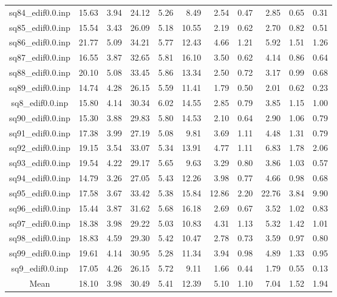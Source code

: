 {\begin{longtable}{@{}cr@{\hspace{1em}}r@{\hspace{1em}}r@{\hspace{1em}}r@{\hspace{1em}}r@{\hspace{2em}}r@{\hspace{1em}}r@{\hspace{1em}}r@{\hspace{1em}}r@{\hspace{1em}}r@{}}
sq84\_edif0.0.inp&15.63&3.94&24.12&5.26&8.49&2.54&0.47&2.85&0.65&0.31\\
sq85\_edif0.0.inp&15.54&3.43&26.09&5.18&10.55&2.19&0.62&2.70&0.82&0.51\\
sq86\_edif0.0.inp&21.77&5.09&34.21&5.77&12.43&4.66&1.21&5.92&1.51&1.26\\
sq87\_edif0.0.inp&16.55&3.87&32.65&5.81&16.10&3.50&0.62&4.14&0.86&0.64\\
sq88\_edif0.0.inp&20.10&5.08&33.45&5.86&13.34&2.50&0.72&3.17&0.99&0.68\\
sq89\_edif0.0.inp&14.74&4.28&26.15&5.59&11.41&1.79&0.50&2.01&0.62&0.23\\
sq8\_edif0.0.inp&15.80&4.14&30.34&6.02&14.55&2.85&0.79&3.85&1.15&1.00\\
sq90\_edif0.0.inp&15.30&3.88&29.83&5.80&14.53&2.10&0.64&2.90&1.06&0.79\\
sq91\_edif0.0.inp&17.38&3.99&27.19&5.08&9.81&3.69&1.11&4.48&1.31&0.79\\
sq92\_edif0.0.inp&19.15&3.54&33.07&5.34&13.91&4.77&1.11&6.83&1.78&2.06\\
sq93\_edif0.0.inp&19.54&4.22&29.17&5.65&9.63&3.29&0.80&3.86&1.03&0.57\\
sq94\_edif0.0.inp&14.79&3.26&27.05&5.43&12.26&3.98&0.77&4.66&0.98&0.68\\
sq95\_edif0.0.inp&17.58&3.67&33.42&5.38&15.84&12.86&2.20&22.76&3.84&9.90\\
sq96\_edif0.0.inp&15.44&3.87&31.62&5.68&16.18&2.69&0.67&3.52&1.02&0.83\\
sq97\_edif0.0.inp&18.38&3.98&29.22&5.03&10.83&4.31&1.13&5.32&1.42&1.01\\
sq98\_edif0.0.inp&18.83&4.59&29.30&5.42&10.47&2.78&0.73&3.59&0.97&0.80\\
sq99\_edif0.0.inp&19.61&4.14&30.95&5.28&11.34&3.94&0.98&4.89&1.33&0.95\\
sq9\_edif0.0.inp&17.05&4.26&26.15&5.72&9.11&1.66&0.44&1.79&0.55&0.13\\
\midrule
Mean&18.10&3.98&30.49&5.41&12.39&5.10&1.10&7.04&1.52&1.94\\
\bottomrule
\end{longtable}}
